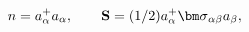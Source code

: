 \begin{equation}
n = a_{\alpha}^{+} a_{\alpha}, \quad \quad {\bf S} = (1/2) a_{\alpha}^{+} 
{\bm \sigma}_{\alpha \beta} a_{\beta},
\label{O}
\end{equation}

